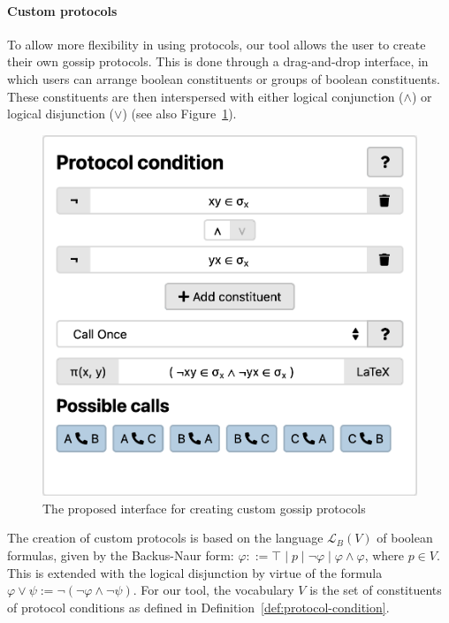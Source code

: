 \paragraph{Custom protocols}
\label{sec:custom-protocols}

To allow more flexibility in using protocols, 
our tool allows the user to create their own gossip protocols.
This is done through a drag-and-drop interface,
in which users can arrange boolean constituents or groups of boolean constituents.
These constituents are then interspersed with either logical conjunction (\(\land\)) or logical disjunction (\(\lor\)) (see also Figure~\ref{fig:protocol-creator}).

\begin{figure}[htb!]
    \centering
    \includegraphics[width=\linewidth]{img/protocol-builder.png}
    \caption{The proposed interface for creating custom gossip protocols}
    \label{fig:protocol-creator}
\end{figure}

The creation of custom protocols is based on the language \(\mathcal{L}_B(V)\) of boolean formulas, 
given by the Backus-Naur form:
\(\varphi ::= \top \mid p \mid \neg \varphi \mid \varphi \land \varphi\), where \(p \in V\). 
This is extended with the logical disjunction by virtue of the formula \(\varphi \lor \psi := \neg(\neg\varphi \land \neg\psi)\).
For our tool, the vocabulary \(V\) is the set of constituents of protocol conditions as defined in Definition~\ref{def:protocol-condition}.

